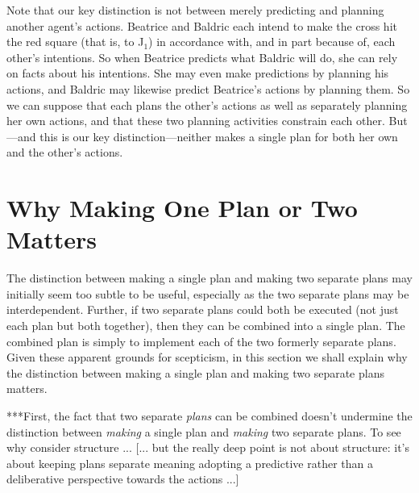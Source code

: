 \documentclass[12pt,\papersize]{extarticle}
\begin{document}
Note that our key distinction is not between merely predicting and planning another agent's actions.
Beatrice and Baldric each intend to make the cross hit the red square (that is, to J${_1}$) in accordance with, and in part because of, each other's intentions.
So when Beatrice predicts what Baldric will do, she can rely on facts about his intentions.
She may even make predictions by planning his actions,
and Baldric may likewise predict Beatrice's actions by planning them.
So we can suppose that each plans the other's actions as well as separately planning her own actions,
and that these two planning activities constrain each other.
But---and this is our key distinction---neither makes a single plan for both her own and the other's actions.



\section{Why Making One Plan or Two Matters}
The distinction between making a single plan and making two separate plans may initially seem too subtle to be useful, 
especially as 
the two separate plans may be interdependent.
Further, if two separate plans could both be executed (not just each plan but both together), then they can be combined into a single plan.
The combined plan is simply to implement each of the two formerly separate plans. 
Given these apparent grounds for scepticism,
in this section we shall explain why the distinction between making a single plan and making two separate plans matters.


***First,
the fact that two separate \emph{plans} can be combined doesn't undermine the distinction between \emph{making} a single plan and \emph{making} two separate plans.
To see why consider structure ...
[... but the really deep point is not about structure: it's about keeping plans separate meaning adopting a predictive rather than a deliberative perspective towards the actions ...]
\end{document}
